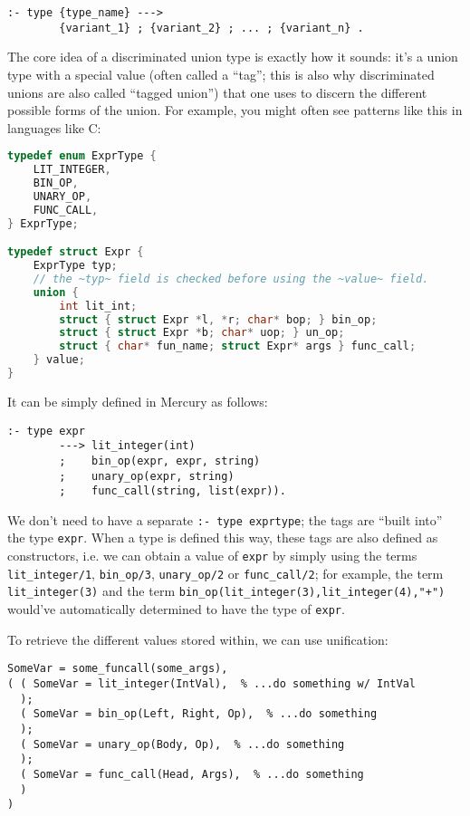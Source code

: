 \begin{lstlisting}[language=Mercury]
:- type {type_name} --->
        {variant_1} ; {variant_2} ; ... ; {variant_n} .
\end{lstlisting}
  
The core idea of a discriminated union type is exactly how it sounds: it's a union type with a special value (often called a ``tag''; this is also why discriminated unions are also called ``tagged union'') that one uses to discern the different possible forms of the union. For example, you might often see patterns like this in languages like C:

\begin{lstlisting}[language=C]
typedef enum ExprType {
    LIT_INTEGER,
    BIN_OP,
    UNARY_OP,
    FUNC_CALL,
} ExprType;

typedef struct Expr {
    ExprType typ;
    // the ~typ~ field is checked before using the ~value~ field.
    union {
        int lit_int;
        struct { struct Expr *l, *r; char* bop; } bin_op;
        struct { struct Expr *b; char* uop; } un_op;
        struct { char* fun_name; struct Expr* args } func_call;
    } value;
}
\end{lstlisting}

  It can be simply defined in Mercury as follows:

\begin{lstlisting}[language=Mercury]
:- type expr
        ---> lit_integer(int)
        ;    bin_op(expr, expr, string)
        ;    unary_op(expr, string)
        ;    func_call(string, list(expr)).
\end{lstlisting}

  We don't need to have a separate \texttt{:- type exprtype}; the tags are ``built into'' the type \texttt{expr}. When a type is defined this way, these tags are also defined as constructors, i.e. we can obtain a value of \texttt{expr} by simply using the terms \texttt{lit\_integer/1}, \texttt{bin\_op/3}, \texttt{unary\_op/2} or \texttt{func\_call/2}; for example, the term \texttt{lit\_integer(3)} and the term \texttt{bin\_op(lit\_integer(3),lit\_integer(4),"+")} would've automatically determined to have the type of \texttt{expr}.

  To retrieve the different values stored within, we can use unification:

\begin{lstlisting}[language=Mercury]
% ...
SomeVar = some_funcall(some_args),
( ( SomeVar = lit_integer(IntVal),  % ...do something w/ IntVal
  );
  ( SomeVar = bin_op(Left, Right, Op),  % ...do something
  );
  ( SomeVar = unary_op(Body, Op),  % ...do something
  );
  ( SomeVar = func_call(Head, Args),  % ...do something
  )
)
\end{lstlisting}

